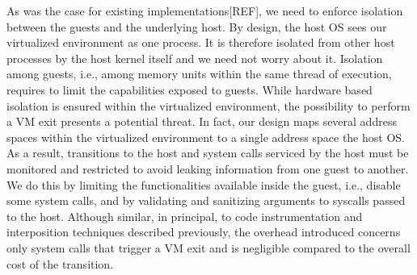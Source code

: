 \documentclass[letterpaper,twocolumn,10pt]{article}
\begin{document}
As was the case for existing implementations[REF], we need to enforce isolation between the guests and the underlying host.
By design, the host OS sees our virtualized environment as one process.
It is therefore isolated from other host processes by the host kernel itself and we need not worry about it.
Isolation among guests, i.e., among memory units within the same thread of execution, requires to limit the capabilities exposed to guests.
While hardware based isolation is ensured within the virtualized environment, the possibility to perform a VM exit presents a potential threat.
In fact, our design maps several address spaces within the virtualized environment to a single address space the host OS.
As a result, transitions to the host and system calls serviced by the host must be monitored and restricted to avoid leaking information from one guest to another. 
We do this by limiting the functionalities available inside the guest, i.e., disable some system calls, and by validating and sanitizing arguments to syscalls passed to the host.
Although similar, in principal, to code instrumentation and interposition techniques described previously, the overhead introduced concerns only system calls that trigger a VM exit and is negligible compared to the overall cost of the transition. \\




\end{document}
